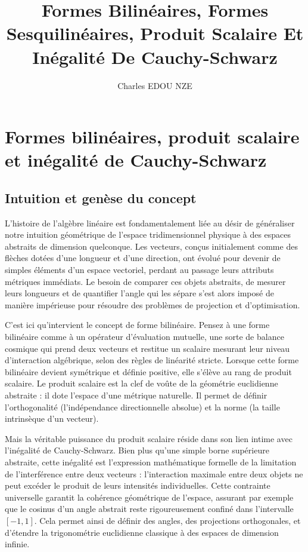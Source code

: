 \documentclass[11pt,a4paper]{report}
\title{Formes Bilinéaires, Formes Sesquilinéaires, Produit Scalaire Et Inégalité De Cauchy-Schwarz}
\author{Charles EDOU NZE}
\date{}
\begin{document}
\maketitle
\tableofcontents
\newpage

\chapter{Formes bilinéaires, produit scalaire et inégalité de Cauchy-Schwarz}

\section{Intuition et genèse du concept}
L'histoire de l'algèbre linéaire est fondamentalement liée au désir de généraliser notre intuition géométrique de l'espace tridimensionnel physique à des espaces abstraits de dimension quelconque. Les vecteurs, conçus initialement comme des flèches dotées d'une longueur et d'une direction, ont évolué pour devenir de simples éléments d'un espace vectoriel, perdant au passage leurs attributs métriques immédiats. Le besoin de comparer ces objets abstraits, de mesurer leurs longueurs et de quantifier l'angle qui les sépare s'est alors imposé de manière impérieuse pour résoudre des problèmes de projection et d'optimisation.

C'est ici qu'intervient le concept de forme bilinéaire. Pensez à une forme bilinéaire comme à un opérateur d'évaluation mutuelle, une sorte de balance cosmique qui prend deux vecteurs et restitue un scalaire mesurant leur niveau d'interaction algébrique, selon des règles de linéarité stricte. Lorsque cette forme bilinéaire devient symétrique et définie positive, elle s'élève au rang de produit scalaire. Le produit scalaire est la clef de voûte de la géométrie euclidienne abstraite : il dote l'espace d'une métrique naturelle. Il permet de définir l'orthogonalité (l'indépendance directionnelle absolue) et la norme (la taille intrinsèque d'un vecteur).

Mais la véritable puissance du produit scalaire réside dans son lien intime avec l'inégalité de Cauchy-Schwarz. Bien plus qu'une simple borne supérieure abstraite, cette inégalité est l'expression mathématique formelle de la limitation de l'interférence entre deux vecteurs : l'interaction maximale entre deux objets ne peut excéder le produit de leurs intensités individuelles. Cette contrainte universelle garantit la cohérence géométrique de l'espace, assurant par exemple que le cosinus d'un angle abstrait reste rigoureusement confiné dans l'intervalle $[-1, 1]$. Cela permet ainsi de définir des angles, des projections orthogonales, et d'étendre la trigonométrie euclidienne classique à des espaces de dimension infinie.
\end{document}
